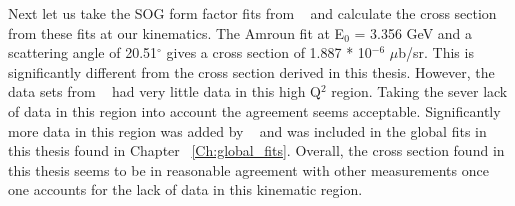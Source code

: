 Next let us take the SOG form factor fits from ~\cite{Article:Amroun} and calculate the cross section from these fits at our kinematics. The Amroun fit at E$_0$ = 3.356 GeV and a scattering angle of 20.51$^{\circ}$ gives a cross section of  1.887 * 10$^{-6}$ $\mu$b/sr. This is significantly different from the cross section derived in this thesis. However, the data sets from ~\cite{Article:Amroun} had very little data in this high Q$^2$ region. Taking the sever lack of data in this region into account the agreement seems acceptable. Significantly more data in this region was added by ~\cite{Article:Alex} and was included in the global fits in this thesis found in Chapter ~\ref{Ch:global_fits}. Overall, the cross section found in this thesis seems to be in reasonable agreement with other measurements once one accounts for the lack of data in this kinematic region.